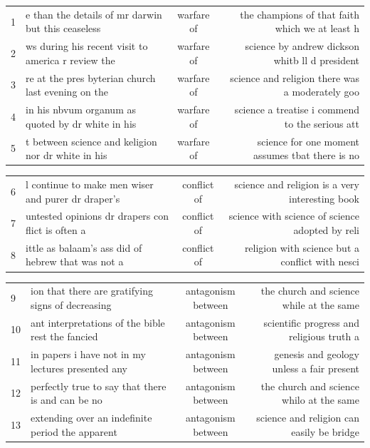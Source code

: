 \documentclass{article}
\begin{document}
\begin{table}[]
        \scriptsize
        \centering
        \begin{tabular}{l|lcr}
        1 & e than the details of mr darwin but this ceaseless & warfare of & the champions of that faith which we at least h \\
        2 & ws during his recent visit to america r review the & warfare of & science by andrew dickson whitb ll d president \\
        3 & re at the pres byterian church last evening on the & warfare of & science and religion there was a moderately goo \\
        4 & in his nbvum organum as quoted by dr white in his & warfare of & science a treatise i commend to the serious att \\
        5 & t between science and keligion nor dr white in his & warfare of & science for one moment assumes tbat there is no \\
      \end{tabular}
      \begin{tabular}{l|lcr}
        6 & l continue to make men wiser and purer dr draper's & conflict of & science and religion is a very interesting book \\
        7 & untested opinions dr drapers con flict is often a & conflict of & science with science of science adopted by reli \\
        8 & ittle as balaam's ass did of hebrew that was not a & conflict of & religion with science but a conflict with nesci \\
        \end{tabular}
        \begin{tabular}{l|lcr}
        9 & ion that there are gratifying signs of decreasing & antagonism between & the church and science while at the same \\
        10 & ant interpretations of the bible rest the fancied & antagonism between & scientific progress and religious truth a \\
        11 & in papers i have not in my lectures presented any & antagonism between &  genesis and geology unless a fair present \\
        12  & perfectly true to say that there is and can be no &  antagonism between &  the church and science whilo at the same  \\
        13  & extending over an indefinite period the apparent &  antagonism between &  science and religion can easily be bridge \\

\end{tabular}
\end{table}
\end{document}
